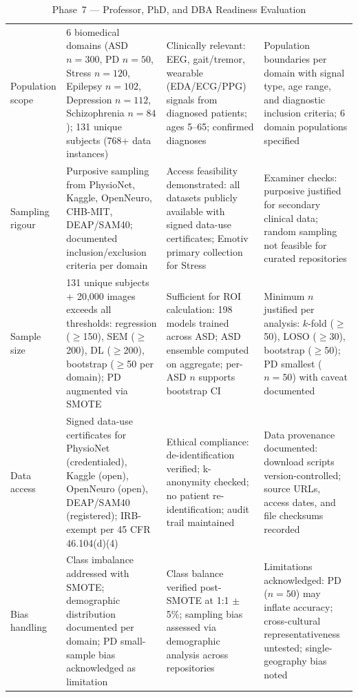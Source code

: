 \begin{xltabular}{\textwidth}{@{} l X X X @{}}
\caption{Phase~7 --- Professor, PhD, and DBA Readiness Evaluation}
\label{tab:phase7_readiness}\\
\toprule
{} &  &  &  \\
\midrule
\endfirsthead
\endhead
\bottomrule
\endlastfoot
Population scope      & 6 biomedical domains (ASD $n=300$, PD $n=50$, Stress $n=120$, Epilepsy $n=102$, Depression $n=112$, Schizophrenia $n=84$); 131 unique subjects (768+ data instances) & Clinically relevant: EEG, gait/tremor, wearable (EDA/ECG/PPG) signals from diagnosed patients; ages 5--65; confirmed diagnoses & Population boundaries per domain with signal type, age range, and diagnostic inclusion criteria; 6 domain populations specified \\
\addlinespace
Sampling rigour       & Purposive sampling from PhysioNet, Kaggle, OpenNeuro, CHB-MIT, DEAP/SAM40; documented inclusion/exclusion criteria per domain & Access feasibility demonstrated: all datasets publicly available with signed data-use certificates; Emotiv primary collection for Stress & Examiner checks: purposive justified for secondary clinical data; random sampling not feasible for curated repositories \\
\addlinespace
Sample size           & 131 unique subjects + 20{,}000 images exceeds all thresholds: regression ($\geq$150), SEM ($\geq$200), DL ($\geq$200), bootstrap ($\geq$50 per domain); PD augmented via SMOTE & Sufficient for ROI calculation: 198 models trained across ASD; ASD ensemble computed on aggregate; per-ASD $n$ supports bootstrap CI & Minimum $n$ justified per analysis: $k$-fold ($\geq$50), LOSO ($\geq$30), bootstrap ($\geq$50); PD smallest ($n=50$) with caveat documented \\
\addlinespace
Data access           & Signed data-use certificates for PhysioNet (credentialed), Kaggle (open), OpenNeuro (open), DEAP/SAM40 (registered); IRB-exempt per 45 CFR 46.104(d)(4) & Ethical compliance: de-identification verified; k-anonymity checked; no patient re-identification; audit trail maintained & Data provenance documented: download scripts version-controlled; source URLs, access dates, and file checksums recorded \\
\addlinespace
Bias handling         & Class imbalance addressed with SMOTE; demographic distribution documented per domain; PD small-sample bias acknowledged as limitation & Class balance verified post-SMOTE at 1:1 $\pm$ 5\%; sampling bias assessed via demographic analysis across repositories & Limitations acknowledged: PD ($n=50$) may inflate accuracy; cross-cultural representativeness untested; single-geography bias noted \\

\end{xltabular}
